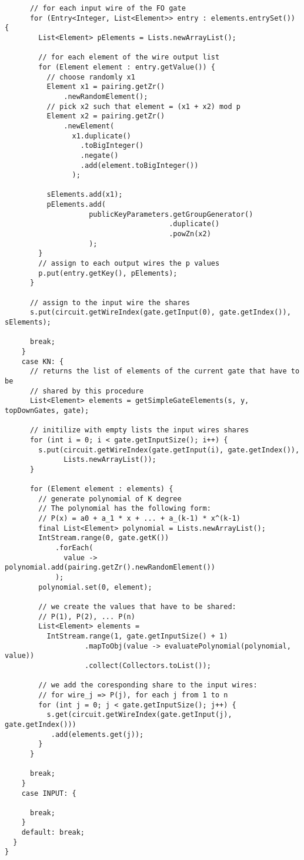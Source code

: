 \documentclass[12pt]{article}
\begin{document}
\begin{lstlisting}
      // for each input wire of the FO gate
      for (Entry<Integer, List<Element>> entry : elements.entrySet()) {
        List<Element> pElements = Lists.newArrayList();
        
        // for each element of the wire output list
        for (Element element : entry.getValue()) {
          // choose randomly x1
          Element x1 = pairing.getZr()
              .newRandomElement();
          // pick x2 such that element = (x1 + x2) mod p
          Element x2 = pairing.getZr()
              .newElement(
                x1.duplicate()
                  .toBigInteger()
                  .negate()
                  .add(element.toBigInteger())
                );

          sElements.add(x1);
          pElements.add(
                    publicKeyParameters.getGroupGenerator()
                                       .duplicate()
                                       .powZn(x2)
                    );
        }
        // assign to each output wires the p values
        p.put(entry.getKey(), pElements);
      }

      // assign to the input wire the shares
      s.put(circuit.getWireIndex(gate.getInput(0), gate.getIndex()), sElements);

      break;
    }
    case KN: {
      // returns the list of elements of the current gate that have to be
      // shared by this procedure
      List<Element> elements = getSimpleGateElements(s, y, topDownGates, gate);

      // initilize with empty lists the input wires shares
      for (int i = 0; i < gate.getInputSize(); i++) {
        s.put(circuit.getWireIndex(gate.getInput(i), gate.getIndex()), 
              Lists.newArrayList());
      }

      for (Element element : elements) {
        // generate polynomial of K degree
        // The polynomial has the following form: 
        // P(x) = a0 + a_1 * x + ... + a_(k-1) * x^(k-1)
        final List<Element> polynomial = Lists.newArrayList();
        IntStream.range(0, gate.getK())
            .forEach(
              value -> polynomial.add(pairing.getZr().newRandomElement())
            );
        polynomial.set(0, element);
        
        // we create the values that have to be shared:
        // P(1), P(2), ... P(n)
        List<Element> elements = 
          IntStream.range(1, gate.getInputSize() + 1)
                   .mapToObj(value -> evaluatePolynomial(polynomial, value))
                   .collect(Collectors.toList());

        // we add the coresponding share to the input wires:
        // for wire_j => P(j), for each j from 1 to n
        for (int j = 0; j < gate.getInputSize(); j++) {
          s.get(circuit.getWireIndex(gate.getInput(j), gate.getIndex()))
           .add(elements.get(j));
        }
      }

      break;
    }
    case INPUT: {

      break;
    }
    default: break;
  }
}
\end{lstlisting}
\end{document}
